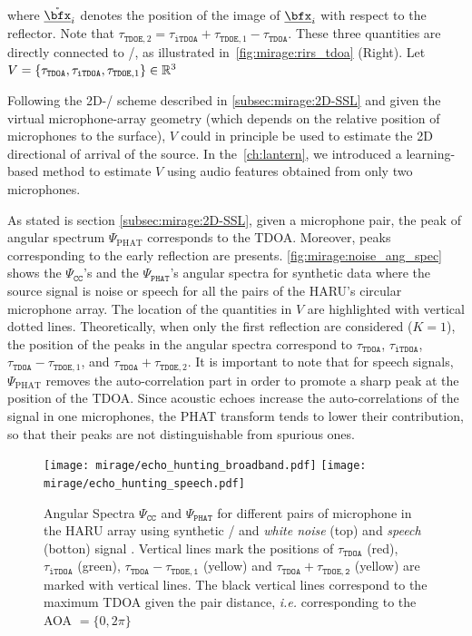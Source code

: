 where $\mathring{\positionMicrophone}_i$ denotes the position of the image of $\positionMicrophone_i$ with respect to the reflector.
Note that $\tau_{\mathtt{TDOE},2} = \tau_\mathtt{iTDOA} + \tau_{\mathtt{TDOE}, 1} - \tau_\mathtt{TDOA}$.
These three quantities are directly connected to \RIRs/, as illustrated in~\cref{fig:mirage:rirs_tdoa} (Right).
Let $V = \set{\tau_{\mathtt{TDOA}}, \tau_{\mathtt{iTDOA}}, \tau_{\mathtt{TDOE},1}}\in\mathbb{R}^3$


\mynewline
Following the 2D-\SSL/ scheme described in \cref{subsec:mirage:2D-SSL} and given the virtual microphone-array geometry (which depends on the relative position of microphones to the surface),
$V$ could in principle be used to estimate the 2D directional of arrival of the source.
In the~\cref{ch:lantern}, we introduced a learning-based method to estimate $V$ using audio features obtained from only two microphones.

\mynewline
As stated is section \ref{subsec:mirage:2D-SSL}, given a microphone pair, the peak of angular spectrum $\Psi_\text{PHAT}$ corresponds to the \ac{TDOA}.
Moreover, peaks corresponding to the early reflection are presents.
\cref{fig:mirage:noise_ang_spec} shows the $\Psi_\mathtt{CC}$'s and the $\Psi_\mathtt{PHAT}$'s angular spectra for synthetic data where the source signal is noise or speech for all the pairs of the HARU's circular microphone array.
The location of the quantities in $V$ are highlighted with vertical dotted lines.
Theoretically, when only the first reflection are considered ($K=1$), the position of the peaks in the angular spectra correspond to
$\tau_\mathtt{TDOA}$, $\tau_\mathtt{iTDOA}$, $\tau_\mathtt{TDOA} - \tau_{\mathtt{TDOE}, 1}$, and $\tau_\mathtt{TDOA} + \tau_{\mathtt{TDOE}, 2}$.
It is important to note that for speech signals, $\Psi_\text{PHAT}$ removes the auto-correlation part in order to promote a sharp peak at the position of the \ac{TDOA}.
Since acoustic echoes increase the auto-correlations of the signal in one microphones, the \ac{PHAT} transform tends to lower their contribution, so that their peaks are not distinguishable from spurious ones.
\begin{figure}
    \begin{fullwidth}
        \centering
        \texttt{[image: mirage/echo\_hunting\_broadband.pdf]}
        \texttt{[image: mirage/echo\_hunting\_speech.pdf]}
        \caption{
            Angular Spectra $\Psi_\mathtt{CC}$ and $\Psi_\texttt{PHAT}$ for different pairs of microphone in the HARU array using synthetic \RIRs/ and \textit{white noise} (top) and \textit{speech} (botton) signal .
            Vertical lines mark the positions of  $\tau_\mathtt{TDOA}$ (red), $\tau_\mathtt{iTDOA}$ (green), $\tau_\mathtt{TDOA}-\tau_\mathtt{TDOE,1}$ (yellow) and $\tau_\mathtt{TDOA}+\tau_\mathtt{TDOE,2}$ (yellow) are marked with vertical lines.
            The black vertical lines correspond to the maximum TDOA given the pair distance, \textit{i.e.} corresponding to the AOA $ = \{0, 2\pi\}$}
        \label{fig:mirag:noise_ang_spec}
    \end{fullwidth}
\end{figure}


